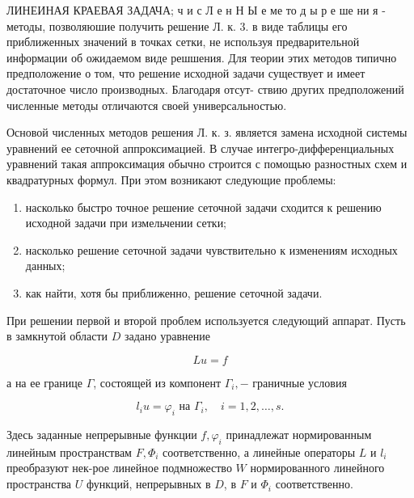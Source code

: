 \documentclass[10pt]{article}
\begin{document}
ЛИНЕИНАЯ КРАЕВАЯ ЗАДАЧА; ч и с Л е н Н Ы е ме то д ы р е ше ни я - методы, позволяюшие получить решение Л. к. 3. в виде таблицы его приближенных значений в точках сетки, не используя предварительной информации об ожидаемом виде решшения. Для теории этих методов типично предположение о том, что решение исходной задачи существует и имеет достаточное число производных. Благодаря отсут- ствию других предположений численные методы отличаются своей универсальностью.



Основой численных методов решения Л. к. з. является замена исходной системы уравнений ее сеточной аппроксимацией. В случае интегро-дифференциальных уравнений такая аппроксимация обычно строится с помощью разностных схем и квадратурных формул. При этом возникают следующие проблемы:



\begin{enumerate}

  \item насколько быстро точное решение сеточной задачи сходится к решению исходной задачи при измельчении сетки;



  \item насколько решение сеточной задачи чувствительно к изменениям исходных данных;



  \item как найти, хотя бы приближенно, решение сеточной задачи.



\end{enumerate}



При решении первой и второй проблем используется следующий аппарат. Пусть в замкнутой области $D$ задано уравнение



\[

L u=f

\]



а на ее границе $\Gamma$, состоящей из компонент $\Gamma_{i},-$ граничные условия



\[

l_{i} u=\varphi_{i} \text { на } \Gamma_{i}, \quad i=1,2, \ldots, s .

\]



Здесь заданные непрерывные функции $f, \varphi_{i}$ принадлежат нормированным линейным пространствам $F, \Phi_{i}$ соответственно, а линейные операторы $L$ и $l_{i}$ преобразуют нек-рое линейное подмножество $W$ нормированного линейного пространства $U$ функций, непрерывных в $D$, в $F$ и $\Phi_{i}$ соответственно.
\end{document}
